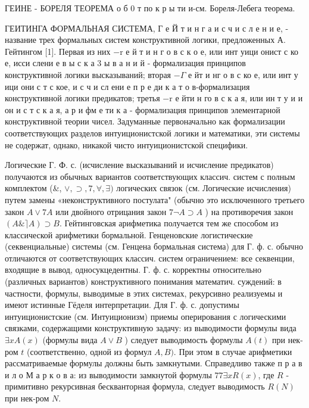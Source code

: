 \documentclass[10pt]{article}
\begin{document}
ГЕИНЕ - БОРЕЛЯ ТЕОРЕМА о б 0 т по к р ы ти и-см. Бореля-Лебега теорема.



ГЕИТИНГА ФОРМАЛЬНАЯ СИСТЕМА, Г е Й т и н г а и с ч и с л е н и е, - название трех формальных систем конструктивной логики, предложенных А. Гейтингом [1]. Первая из них $-\mathrm{r}$ е й т и н $г$ о в с к о е, или инт уици онист с ко е, исси слени е в ы с к а 3 ы в а н и й - формализация принципов конструктивной логики высказываний; вторая $-\Gamma$ е йт и нг о в с ко е, или инт у ици они с т с кое, и с ч и сл ени е п р е ди к а т о в-формализация конструктивной логики предикатов; третья $-\mathrm{r}$ е йти н го в с к а я, или ин т у и и он и с т с к а я, а р и фм е ти к а - формализация принципов элементарной конструктивной теории чисел. Задуманные первоначально как формализации соответствующих разделов интуиционистской логики и математики, эти системы не содержат, однако, никакой чисто интуиционистской специфики.



Логические Г. Ф. с. (исчисление высказываний и исчисление предикатов) получаются из обычных вариантов соответствующих классич. систем с полным комплектом (\&, $\vee, \supset, 7, \forall, \exists)$ логических связок (см. Логические исчисления) путем замены «неконструктивного постулата" (обычно это исключенного третьего закон $A \vee 7 A$ или двойного отрицания закон $7 \neg A \supset A$ ) на противоречия закон $(A \&\rceil A) \supset B$. Гейтинговская арифметика получается тем же способом из классической арифметики бормальной. Генценовские логистические (секвенциальные) системы (см. Генцена бормальная система) для Г. ф. с. обычно отличаются от соответствующих классич. систем ограничением: все секвенции, входящие в вывод, односукцедентны. Г. ф. с. корректны относительно (различных вариантов) конструктивного понимания математич. суждений: в частности, формулы, выводимые в этих системах, рекурсивно реализуемы и имеют истинные Гёделя интерпретации. Для Г. ф. с. допустимы интуиционистские (см. Интуиционизм) приемы оперирования с логическими связками, содержащими конструктивную задачу: из выводимости формулы вида $\exists x A(x)$ (формулы вида $A \vee B$ ) следует выводимость формулы $A(t)$ при нек-ром $t$ (соответственно, одной из формул $A, B)$. При этом в случае арифметики рассматриваемые формулы должны быть замкнутыми. Справедливо также п р а в и л о М а р к о в а: из выводимости замкнутой формулы $77 \exists x R(x)$, где $R$ - примитивно рекурсивная бескванторная формула, следует выводимость $R(N)$ при нек-ром $N$.
\end{document}
